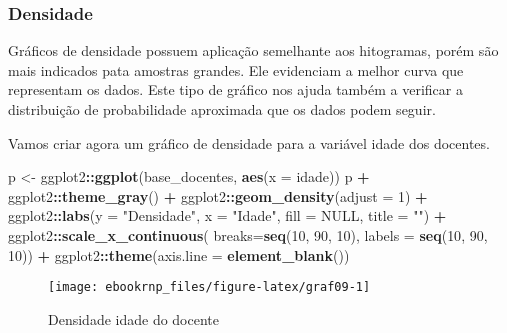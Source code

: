 \documentclass[12pt,]{style/krantz}
\makeatletter
\newenvironment{Shaded}{\begin{snugshade}}{\end{snugshade}}
\newcommand{\DataTypeTok}[1]{\textcolor[rgb]{0.13,0.29,0.53}{#1}}
\newcommand{\DecValTok}[1]{\textcolor[rgb]{0.00,0.00,0.81}{#1}}
\newcommand{\KeywordTok}[1]{\textcolor[rgb]{0.13,0.29,0.53}{\textbf{#1}}}
\newcommand{\NormalTok}[1]{#1}
\newcommand{\OperatorTok}[1]{\textcolor[rgb]{0.81,0.36,0.00}{\textbf{#1}}}
\newcommand{\OtherTok}[1]{\textcolor[rgb]{0.56,0.35,0.01}{#1}}
\newcommand{\StringTok}[1]{\textcolor[rgb]{0.31,0.60,0.02}{#1}}
\newenvironment{kframe}{%
\medskip{}
\setlength{\fboxsep}{.8em}
 \def\at@end@of@kframe{}%
 \ifinner\ifhmode%
  \def\at@end@of@kframe{\end{minipage}}%
  \begin{minipage}{\columnwidth}%
 \fi\fi%
 \def\FrameCommand##1{\hskip\@totalleftmargin \hskip-\fboxsep
 \colorbox{shadecolor}{##1}\hskip-\fboxsep
     \hskip-\linewidth \hskip-\@totalleftmargin \hskip\columnwidth}%
 \MakeFramed {\advance\hsize-\width
   \@totalleftmargin\z@ \linewidth\hsize
   \@setminipage}}%
 {\par\unskip\endMakeFramed%
 \at@end@of@kframe}
\renewenvironment{Shaded}{\begin{kframe}}{\end{kframe}}
\theoremstyle{definition}
\theoremstyle{definition}
\theoremstyle{definition}
\theoremstyle{remark}
\let\BeginKnitrBlock\begin \let\EndKnitrBlock\end
\makeatother
\begin{document}
\hypertarget{densidade}{%
\subsubsection{Densidade}\label{densidade}}

Gráficos de densidade possuem aplicação semelhante aos hitogramas, porém são mais indicados pata amostras grandes. Ele evidenciam a melhor curva que representam os dados. Este tipo de gráfico nos ajuda também a verificar a distribuição de probabilidade aproximada que os dados podem seguir.

\BeginKnitrBlock{example}
\protect\hypertarget{exm:unnamed-chunk-56}{}{\label{exm:unnamed-chunk-56} }Vamos criar agora um gráfico de densidade para a variável idade dos docentes.
\EndKnitrBlock{example}

\begin{Shaded}
\begin{Highlighting}[]
\NormalTok{p <-}\StringTok{ }\NormalTok{ggplot2}\OperatorTok{::}\KeywordTok{ggplot}\NormalTok{(base_docentes, }\KeywordTok{aes}\NormalTok{(}\DataTypeTok{x =}\NormalTok{ idade))}
\NormalTok{p }\OperatorTok{+}\StringTok{ }\NormalTok{ggplot2}\OperatorTok{::}\KeywordTok{theme_gray}\NormalTok{() }\OperatorTok{+}
\StringTok{  }\NormalTok{ggplot2}\OperatorTok{::}\KeywordTok{geom_density}\NormalTok{(}\DataTypeTok{adjust =} \DecValTok{1}\NormalTok{) }\OperatorTok{+}
\StringTok{  }\NormalTok{ggplot2}\OperatorTok{::}\KeywordTok{labs}\NormalTok{(}\DataTypeTok{y =} \StringTok{"Densidade"}\NormalTok{, }\DataTypeTok{x =} \StringTok{"Idade"}\NormalTok{, }\DataTypeTok{fill =} \OtherTok{NULL}\NormalTok{, }\DataTypeTok{title =} \StringTok{""}\NormalTok{) }\OperatorTok{+}
\StringTok{  }\NormalTok{ggplot2}\OperatorTok{::}\KeywordTok{scale_x_continuous}\NormalTok{(}
    \DataTypeTok{breaks=}\KeywordTok{seq}\NormalTok{(}\DecValTok{10}\NormalTok{, }\DecValTok{90}\NormalTok{, }\DecValTok{10}\NormalTok{),}
    \DataTypeTok{labels =} \KeywordTok{seq}\NormalTok{(}\DecValTok{10}\NormalTok{, }\DecValTok{90}\NormalTok{, }\DecValTok{10}\NormalTok{)) }\OperatorTok{+}
\StringTok{  }\NormalTok{ggplot2}\OperatorTok{::}\KeywordTok{theme}\NormalTok{(}\DataTypeTok{axis.line =} \KeywordTok{element_blank}\NormalTok{())}
\end{Highlighting}
\end{Shaded}

\begin{figure}[H]

{\centering \texttt{[image: ebookrnp\_files/figure-latex/graf09-1]} 

}

\caption{Densidade idade do docente}\label{fig:graf09}
\end{figure}
\end{document}
